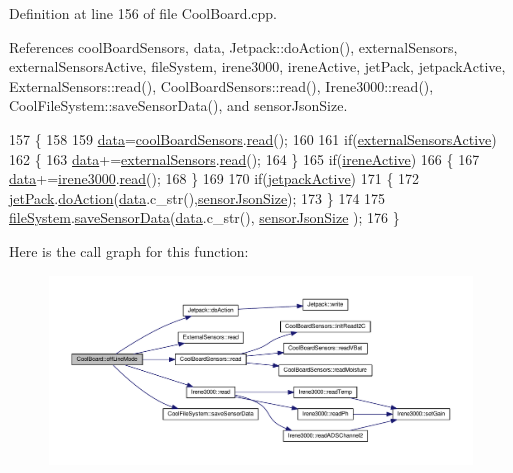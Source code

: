 Definition at line 156 of file Cool\+Board.\+cpp.



References cool\+Board\+Sensors, data, Jetpack\+::do\+Action(), external\+Sensors, external\+Sensors\+Active, file\+System, irene3000, irene\+Active, jet\+Pack, jetpack\+Active, External\+Sensors\+::read(), Cool\+Board\+Sensors\+::read(), Irene3000\+::read(), Cool\+File\+System\+::save\+Sensor\+Data(), and sensor\+Json\+Size.


\begin{DoxyCode}
157 \{
158 
159     \hyperlink{classCoolBoard_a427fb753dd8575bdf821c70a5c63d695}{data}=\hyperlink{classCoolBoard_af102be5288bd7f7a8e59b13f86e26a00}{coolBoardSensors}.\hyperlink{classCoolBoardSensors_a91badb2539d91fda8679f2a597874c48}{read}();
160     
161     \textcolor{keywordflow}{if}(\hyperlink{classCoolBoard_af29860cc422622dc33614f9eabb58c40}{externalSensorsActive})
162     \{
163         \hyperlink{classCoolBoard_a427fb753dd8575bdf821c70a5c63d695}{data}+=\hyperlink{classCoolBoard_a09e26264839c65873eb56af476eff6b2}{externalSensors}.\hyperlink{classExternalSensors_a53177b81eca3be89508b5511ddcd00fc}{read}();    
164     \}       
165     \textcolor{keywordflow}{if}(\hyperlink{classCoolBoard_a1de9b5516695b2e1668bf2e3a6701332}{ireneActive})
166     \{
167         \hyperlink{classCoolBoard_a427fb753dd8575bdf821c70a5c63d695}{data}+=\hyperlink{classCoolBoard_ad103718ce316006c4695b8eb312eaf11}{irene3000}.\hyperlink{classIrene3000_a852a170feea994ea1df01c6b245b5d9a}{read}(); 
168     \}
169     
170     \textcolor{keywordflow}{if}(\hyperlink{classCoolBoard_a4dc6ff276ed178975bd8b459fa7421dc}{jetpackActive})
171     \{
172         \hyperlink{classCoolBoard_a30b1357881b01ccbec676856a91e48e9}{jetPack}.\hyperlink{classJetpack_a86d2e83436ef4b85f4c3a6e85ac785b0}{doAction}(\hyperlink{classCoolBoard_a427fb753dd8575bdf821c70a5c63d695}{data}.c\_str(),\hyperlink{classCoolBoard_a58e4b6072e3ac8b141ec0befb479208e}{sensorJsonSize}); 
173     \}   
174 
175     \hyperlink{classCoolBoard_a42c2586fbb13ff7f06538e9284e8538d}{fileSystem}.\hyperlink{classCoolFileSystem_a4c560c2ddd40b74b7758e6ceb2c58957}{saveSensorData}(\hyperlink{classCoolBoard_a427fb753dd8575bdf821c70a5c63d695}{data}.c\_str(), 
      \hyperlink{classCoolBoard_a58e4b6072e3ac8b141ec0befb479208e}{sensorJsonSize} ); 
176 \}
\end{DoxyCode}
Here is the call graph for this function\+:
\nopagebreak
\begin{figure}[H]
\begin{center}
\leavevmode
\includegraphics[width=350pt]{classCoolBoard_ae6b5e1274d760462290192acea4adca8_cgraph}
\end{center}
\end{figure}
